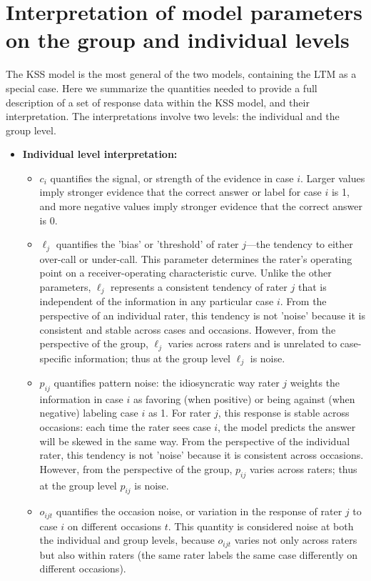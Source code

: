 \section*{Interpretation of model parameters on the group and individual levels}\label{section-interpretation}
The KSS model is the most general of the two models, containing the LTM as a special case. Here we summarize the quantities needed to provide a full description of a set of response data within the KSS model, and their interpretation. The interpretations involve two levels: the individual and the group level.

\begin{itemize}
    \item \textbf{Individual level interpretation:}
    \begin{itemize}
    \item $c_i$ quantifies the signal, or strength of the evidence in case $i$. Larger values imply stronger evidence that the correct answer or label for case $i$ is 1, and more negative values imply stronger evidence that the correct answer is 0.
    \item $\ell_j$ quantifies the 'bias' or 'threshold' of rater $j$---the tendency to either over-call or under-call. This parameter determines the rater's operating point on a receiver-operating characteristic curve. Unlike the other parameters, $\ell_j$ represents a consistent tendency of rater $j$ that is independent of the information in any particular case $i$. From the perspective of an individual rater, this tendency is not 'noise' because it is consistent and stable across cases and occasions. However, from the perspective of the group, $\ell_j$ varies across raters and is unrelated to case-specific information; thus at the group level $\ell_j$ is noise.
    \item $p_{ij}$ quantifies pattern noise: the idiosyncratic way rater $j$ weights the information in case $i$ as favoring (when positive) or being against (when negative) labeling case $i$ as 1. For rater $j$, this response is stable across occasions: each time the rater sees case $i$, the model predicts the answer will be skewed in the same way. From the perspective of the individual rater, this tendency is not 'noise' because it is consistent across occasions. However, from the perspective of the group, $p_{ij}$ varies across raters; thus at the group level $p_{ij}$ is noise.
    \item $o_{ijt}$ quantifies the occasion noise, or variation in the response of rater $j$ to case $i$ on different occasions $t$. This quantity is considered noise at both the individual and group levels, because $o_{ijt}$ varies not only across raters but also within raters (the same rater labels the same case differently on different occasions).

\end{itemize}
\end{itemize}
